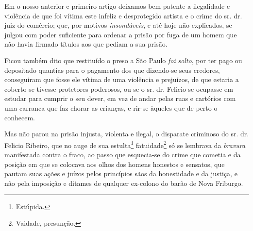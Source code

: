Em o nosso anterior e primeiro artigo deixamos bem patente a ilegalidade
e violência de que foi vítima este infeliz e desprotegido artista e o
crime do sr. dr. juiz do comércio; que, por motivos \emph{insondáveis},
e até hoje não explicados, se julgou com poder suficiente para ordenar a
prisão por fuga de um homem que não havia firmado títulos aos que pediam
a sua prisão.

Ficou também dito que restituído o preso a São Paulo \emph{foi}
\emph{solto}, por ter pago ou depositado quantias para o pagamento dos
que dizendo-se seus credores, conseguiram que fosse ele vítima de uma
violência e prejuízos, de que estaria a coberto se tivesse protetores
poderosos, ou se o sr. dr. Felicio se ocupasse em estudar para cumprir o
seu dever, em vez de andar pelas ruas e cartórios com uma carranca que
faz chorar as crianças, e rir-se àqueles que de perto o conhecem.

Mas não parou na prisão injusta, violenta e ilegal, o disparate
criminoso do sr. dr. Felicio Ribeiro, que no auge de sua
estulta\footnote{ Estúpida.} fatuidade\footnote{ Vaidade, presunção.}
só se lembrava da \emph{bravura} manifestada contra o fraco, ao passo
que esquecia-se do crime que cometia e da posição em que se colocava aos
olhos dos homens honestos e sensatos, que pautam suas ações e juízos
pelos princípios sãos da honestidade e da justiça, e não pela imposição
e ditames de qualquer ex-colono do barão de Nova Friburgo.

